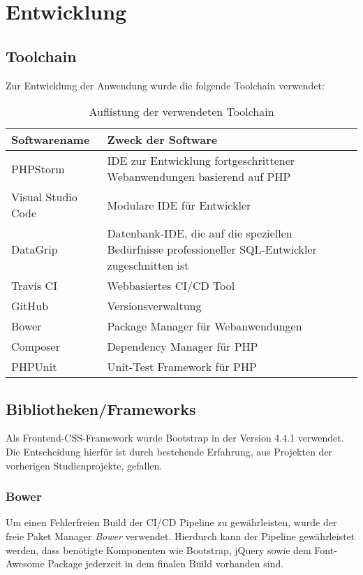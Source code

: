 \chapter{Entwicklung}\label{ch:entwicklung}

\section{Toolchain}\label{sec:toolchain}
Zur Entwicklung der Anwendung wurde die folgende Toolchain verwendet:

\begin{table}[htb]
\centering
\begin{tabular}{p{5cm}  p{9cm}}
\hline
\textbf{Softwarename} & \textbf{Zweck der Software}\\
\hline
PHPStorm & IDE zur Entwicklung fortgeschrittener Webanwendungen basierend auf PHP\\
\hline
Visual Studio Code & Modulare IDE für Entwickler\\ 
\hline
DataGrip & Datenbank-IDE, die auf die speziellen Bedürfnisse professioneller SQL-Entwickler zugeschnitten ist\\
\hline
Travis CI & Webbasiertes CI/CD Tool\\
\hline
GitHub & Versionsverwaltung\\
\hline
Bower & Package Manager für Webanwendungen\\
\hline
Composer & Dependency Manager für PHP \\
\hline
PHPUnit & Unit-Test Framework für PHP \\ 
\hline
\end{tabular}
\caption{Auflistung der verwendeten Toolchain}
\end{table}

\section{Bibliotheken/Frameworks}\label{sec:bibliotheken/frameworks}
Als Frontend-CSS-Framework wurde Bootstrap in der Version 4.4.1 verwendet. Die Entscheidung hierfür ist durch bestehende Erfahrung, aus Projekten der vorherigen Studienprojekte, gefallen.
\subsection{Bower}\label{subsec:bower}
Um einen Fehlerfreien Build der CI/CD Pipeline zu gewährleisten, wurde der freie Paket Manager \emph{Bower} verwendet. Hierdurch kann der Pipeline gewährleistet werden, dass benötigte Komponenten wie Bootstrap, jQuery sowie dem Font-Awesome Package jederzeit in dem finalen Build vorhanden sind.
